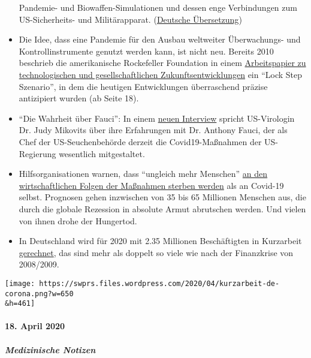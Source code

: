 \begin{itemize}
  Pandemie- und Biowaffen-Simulationen und dessen enge Verbindungen zum
  US-Sicherheits- und Militärapparat.
  (\href{https://www.theblogcat.de/uebersetzungen/dark-winter-01-04-2020/}{Deutsche
  Übersetzung})
\item
  Die Idee, dass eine Pandemie für den Ausbau weltweiter Überwachungs-
  und Kontroll­instrumente genutzt werden kann, ist nicht neu. Bereits
  2010 beschrieb die amerikanische Rockefeller Foundation in einem
  \href{https://swprs.files.wordpress.com/2020/04/rockefeller-foundation-scenarios-2010.pdf}{Arbeitspapier
  zu technologischen und gesellschaftlichen Zukunftsentwicklungen} ein
  ``Lock Step Szenario'', in dem die heutigen Entwicklungen überraschend
  präzise antizipiert wurden (ab Seite 18).
\item
  ``Die Wahrheit über Fauci'': In einem
  \href{https://childrenshealthdefense.org/news/the-truth-about-fauci-featuring-dr-judy-mikovits/}{neuen
  Interview} spricht US-Virologin Dr. Judy Mikovits über ihre
  Erfahrungen mit Dr. Anthony Fauci, der als Chef der US-Seuchenbehörde
  derzeit die Covid19-Maßnahmen der US-Regierung wesentlich
  mitgestaltet.
\item
  Hilfsorganisationen warnen, dass ``ungleich mehr Menschen''
  \href{https://www.welt.de/wirtschaft/article207092745/Corona-Pandemie-Rezession-beschert-der-Welt-die-noch-groessere-Katastrophe.html}{an
  den wirtschaftlichen Folgen der Maßnahmen sterben werden} als an
  Covid-19 selbst. Prognosen gehen inzwischen von 35 bis 65 Millionen
  Menschen aus, die durch die globale Rezession in absolute Armut
  abrutschen werden. Und vielen von ihnen drohe der Hungertod.
\item
  In Deutschland wird für 2020 mit 2.35 Millionen Beschäftigten in
  Kurzarbeit
  \href{https://www.boeckler.de/pdf/p_wsi_pb_38_2020.pdf}{gerechnet},
  das sind mehr als doppelt so viele wie nach der Finanzkrise von
  2008/2009.
\end{itemize}

\texttt{[image: https://swprs.files.wordpress.com/2020/04/kurzarbeit-de-corona.png?w=650\\\&h=461]}

\hypertarget{18-april-2020}{%
\paragraph{18. April 2020}\label{18-april-2020}}

\hypertarget{medizinische-notizen}{%
\subparagraph{\texorpdfstring{\textbf{Medizinische
Notizen}}{Medizinische Notizen}}\label{medizinische-notizen}}


